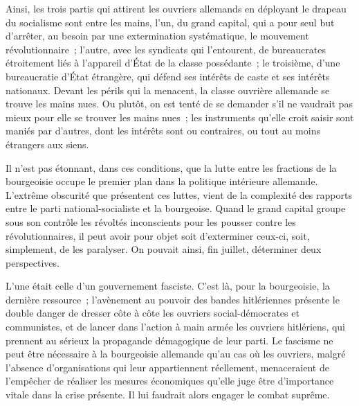 \documentclass[french,twoside]{book} %
\begin{document}
\noindent Ainsi, les trois partis qui attirent les ouvriers allemands en déployant le drapeau du socialisme sont entre les mains, l'un, du grand capital, qui a pour seul but d'arrêter, au besoin par une extermination systématique, le mouve­ment révolutionnaire ; l'autre, avec les syndicats qui l'entourent, de bureau­crates étroitement liés à l'appareil d'État de la classe possédante ; le troisième, d'une bureaucratie d'État étrangère, qui défend ses intérêts de caste et ses intérêts nationaux. Devant les périls qui la menacent, la classe ouvrière allemande se trouve les mains nues. Ou plutôt, on est tenté de se demander s'il ne vaudrait pas mieux pour elle se trouver les mains nues ; les instruments qu'elle croit saisir sont maniés par d'autres, dont les intérêts sont ou contraires, ou tout au moins étrangers aux siens.\par
Il n'est pas étonnant, dans ces conditions, que la lutte entre les fractions de la bourgeoisie occupe le premier plan dans la politique intérieure allemande. L'extrême obscurité que présentent ces luttes, vient de la complexité des rapports entre le parti national-socialiste et la bourgeoise. Quand le grand capital groupe sous son contrôle les révoltés inconscients pour les pousser contre les révolutionnaires, il peut avoir pour objet soit d'exterminer ceux-ci, soit, simplement, de les paralyser. On pouvait ainsi, fin juillet, déterminer deux perspectives.\par
L'une était celle d'un gouvernement fasciste. C'est là, pour la bourgeoisie, la dernière ressource ; l'avènement au pouvoir des bandes hitlériennes présente le double danger de dresser côte à côte les ouvriers social-démocrates et communistes, et de lancer dans l'action à main armée les ouvriers hitlériens, qui prennent au sérieux la propagande démagogique de leur parti. Le fascisme ne peut être nécessaire à la bourgeoisie allemande qu'au cas où les ouvriers, malgré l'absence d'organisations qui leur appartiennent réellement, menace­raient de l'empêcher de réaliser les mesures économiques qu'elle juge être d'importance vitale dans la crise présente. Il lui faudrait alors engager le combat suprême.\par
\end{document}
